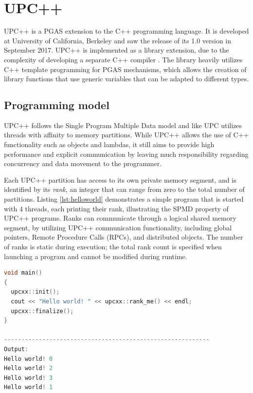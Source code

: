 \documentclass{uit-report}
\begin{document}
\section{UPC++}
UPC++ is a PGAS extension to the C++ programming language. It is developed at University of California, Berkeley and saw the release of its 1.0 version in September 2017. UPC++ is implemented as a library extension, due to the complexity of developing a separate C++ compiler \cite{zheng_kamil_driscoll_shan_yelick_2014}. The library heavily utilizes C++ template programming \cite{web_cpp_template} for PGAS mechanisms, which allows the creation of library functions that use generic variables that can be adapted to different types. 

\subsection{Programming model}
UPC++ follows the Single Program Multiple Data model and like UPC utilizes threads with affinity to memory partitions. While UPC++ allows the use of C++ functionality such as objects and lambdas, it still aims to provide high performance and explicit communication by leaving much responsibility regarding concurrency and data movement to the programmer.

Each UPC++ partition has access to its own private memory segment, and is identified by its \emph{rank}, an integer that can range from zero to the total number of partitions. Listing \ref{lst:helloworld} demonstrates a simple program that is started with 4 threads, each printing their rank, illustrating the SPMD property of UPC++ programs. Ranks can communicate through a logical shared memory segment, by utilizing UPC++ communication functionality, including global pointers, Remote Procedure Calls (RPCs), and distributed objects. The number of ranks is static during execution; the total rank count is specified when launching a program and cannot be modified during runtime.


\begin{lstlisting}[label={lst:helloworld}, float, caption="Hello World"-program in UPC++ and its output, frame=tlrb, captionpos=b, language=c++, showstringspaces=false]
void main()
{
  upcxx::init();
  cout << "Hello world! " << upcxx::rank_me() << endl;
  upcxx::finalize();
}

-----------------------------------------------------------
Output:
Hello world! 0
Hello world! 2
Hello world! 3
Hello world! 1
\end{lstlisting}
\end{document}
